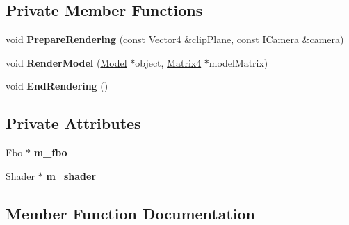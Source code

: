 \subsection*{Private Member Functions}
\begin{DoxyCompactItemize}
\item 
\mbox{\label{class_flounder_1_1_renderer_shadows_a208ff31e8093219a0b6c2bea765a6b0e}} 
void {\bfseries Prepare\+Rendering} (const \hyperlink{class_flounder_1_1_vector4}{Vector4} \&clip\+Plane, const \hyperlink{class_flounder_1_1_i_camera}{I\+Camera} \&camera)
\item 
\mbox{\label{class_flounder_1_1_renderer_shadows_a3af09b7c7f4e90b99bca6698b6c08784}} 
void {\bfseries Render\+Model} (\hyperlink{class_flounder_1_1_model}{Model} $\ast$object, \hyperlink{class_flounder_1_1_matrix4}{Matrix4} $\ast$model\+Matrix)
\item 
\mbox{\label{class_flounder_1_1_renderer_shadows_a5e32a156c8ba18edaf01767c2aadd6a2}} 
void {\bfseries End\+Rendering} ()
\end{DoxyCompactItemize}
\subsection*{Private Attributes}
\begin{DoxyCompactItemize}
\item 
\mbox{\label{class_flounder_1_1_renderer_shadows_ad3fc82daa0eb59c5a5cf9ca7304334d4}} 
Fbo $\ast$ {\bfseries m\+\_\+fbo}
\item 
\mbox{\label{class_flounder_1_1_renderer_shadows_aba950ac80580411455c5eb432c3b45ad}} 
\hyperlink{class_flounder_1_1_shader}{Shader} $\ast$ {\bfseries m\+\_\+shader}
\end{DoxyCompactItemize}


\subsection{Member Function Documentation}
\mbox{\label{class_flounder_1_1_renderer_shadows_a39c5548d3cbe75ce7bfe346d209af7a9}} 
